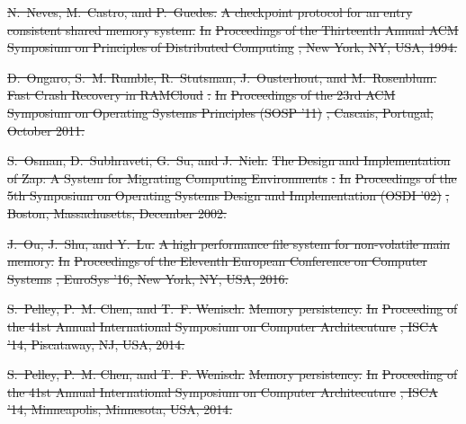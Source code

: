 \documentclass[sigconf]{acmart}
\renewcommand{\em}{\it}
\providecommand{\DIFdel}[1]{{\protect\color{red}\sout{#1}}}                      %
\begin{document}
{%
\DIFdel{N.~Neves, M.~Castro, and P.~Guedes.
}%
\DIFdel{A checkpoint protocol for an entry consistent shared memory system.
}%
\DIFdel{In }%
\DIFdel{Proceedings of the Thirteenth Annual ACM Symposium on
  Principles of Distributed Computing}%
\DIFdel{, New York, NY, USA, 1994.
}%

\DIFdel{D.~Ongaro, S.~M. Rumble, R.~Stutsman, J.~Ousterhout, and M.~Rosenblum.
}%
\DIFdel{Fast Crash Recovery in RAMCloud}%
\DIFdel{.
}%
\DIFdel{In }%
\DIFdel{Proceedings of the 23rd ACM Symposium on Operating Systems
  Principles (SOSP '11)}%
\DIFdel{, Cascais, Portugal, October 2011.
}%

\DIFdel{S.~Osman, D.~Subhraveti, G.~Su, and J.~Nieh.
}%
\DIFdel{The Design and Implementation of Zap: A System for Migrating
  Computing Environments}%
\DIFdel{.
}%
\DIFdel{In }%
\DIFdel{Proceedings of the 5th Symposium on Operating Systems Design
  and Implementation (OSDI '02)}%
\DIFdel{, Boston, Massachusetts, December 2002.
}%

\DIFdel{J.~Ou, J.~Shu, and Y.~Lu.
}%
\DIFdel{A high performance file system for non-volatile main memory.
}%
\DIFdel{In }%
\DIFdel{Proceedings of the Eleventh European Conference on Computer
  Systems}%
\DIFdel{, EuroSys '16, New York, NY, USA, 2016.
}%

\DIFdel{S.~Pelley, P.~M. Chen, and T.~F. Wenisch.
}%
\DIFdel{Memory persistency.
}%
\DIFdel{In }%
\DIFdel{Proceeding of the 41st Annual International Symposium on
  Computer Architecuture}%
\DIFdel{, ISCA '14, Piscataway, NJ, USA, 2014.
}%

\DIFdel{S.~Pelley, P.~M. Chen, and T.~F. Wenisch.
}%
\DIFdel{Memory persistency.
}%
\DIFdel{In }%
\DIFdel{Proceeding of the 41st Annual International Symposium on
  Computer Architecuture}%
\DIFdel{, ISCA '14, Minneapolis, Minnesota, USA, 2014.
}%

}
\end{document}
